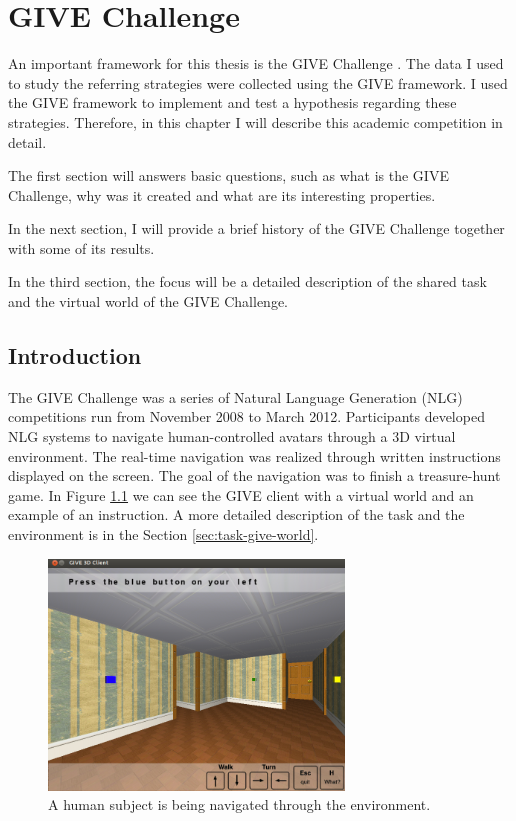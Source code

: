 \chapter{GIVE Challenge}
\label{chap:give-challenge}
An important framework for this thesis is the GIVE Challenge \citep{koller2010first}. The data I used to study the referring strategies were collected using the GIVE framework. I used the GIVE framework to implement and test a hypothesis regarding these strategies. Therefore, in this chapter I will describe this academic competition in detail.  

The first section will answers basic questions, such as what is the GIVE Challenge, why was it created and what are its interesting properties. 

In the next section, I will provide a brief history of the GIVE Challenge together with some of its results. 

In the third section, the focus will be a detailed description of the shared task and the virtual world of the GIVE Challenge.

\section{Introduction}
The GIVE Challenge was a series of Natural Language Generation (NLG) competitions run from November 2008 to March 2012. Participants developed NLG systems to navigate human-controlled avatars through a 3D virtual environment. The real-time navigation was realized through written instructions displayed on the screen. The goal of the navigation was to finish a treasure-hunt game. In Figure \ref{fig:give-client} we can see the GIVE client with a virtual world and an example of an instruction. A more detailed description of the task and the environment is in the Section \ref{sec:task-give-world}.

\begin{figure}[!htbp]
  \centering
	\includegraphics[width=0.7\textwidth]{Images/give-client}
	\caption{A human subject is being navigated through the environment.}
	\label{fig:give-client}
\end{figure}

